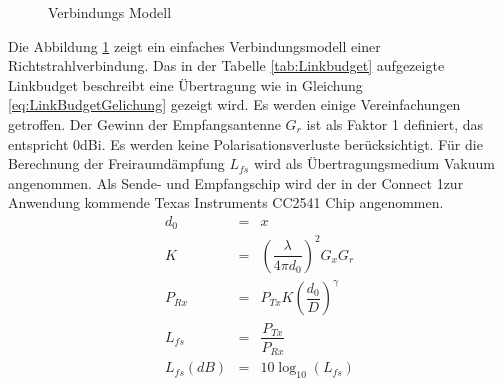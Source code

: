 \begin{figure}[h]
\begin{center}
\end{center}
\caption{Verbindungs Modell}
\label{fig:LinkModell}
\end{figure}

Die Abbildung \ref{fig:LinkModell} zeigt ein einfaches Verbindungsmodell einer Richtstrahlverbindung. Das in der Tabelle \ref{tab:Linkbudget} aufgezeigte Linkbudget beschreibt eine Übertragung wie in Gleichung \ref{eq:LinkBudgetGelichung} gezeigt wird. Es werden einige Vereinfachungen getroffen. Der Gewinn der Empfangsantenne $G_{r}$  ist als Faktor 1 definiert, das entspricht 0dBi. Es werden keine Polarisationsverluste berücksichtigt. Für die Berechnung der Freiraumdämpfung $L_{fs}$ wird als Übertragungsmedium Vakuum angenommen. Als Sende- und Empfangschip wird der in der \glqq Connect 1\grqq zur Anwendung kommende Texas Instruments CC2541 Chip angenommen.
\begin{eqnarray}
    	d_{0} 	&=& x \\ \label{eq:d0_LinkBudget}
    K		&=& \left(\dfrac{\lambda}{4\pi d_{0}} \right)^{2}G_{x}G_{r} \\ \label{eq:K_LinkBudget}
    P_{Rx} 	&=& P_{Tx}K \left( \dfrac{d_{0}}{D}\right)^{\gamma} \\ \label{eq:Prx_LinkBudget}
    L_{fs} 	&=& \dfrac{P_{Tx}}{P_{Rx}} \\ \label{eq:Freiraumdaempfung}
    L_{fs}(dB) 	&=& 10\log_{10}(L_{fs}) \label{eq:Freiraumdaempfung_dB}
\end{eqnarray}


